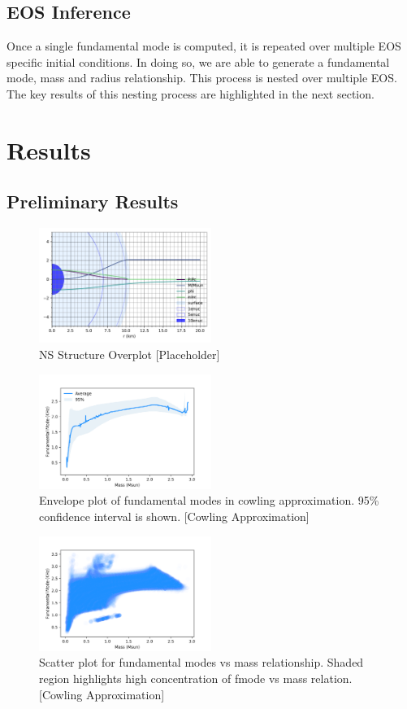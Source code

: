 \documentclass[aps,prd,twocolumn,superscriptaddress,footinbib]{revtex4-1}
\begin{document}
\subsection{EOS Inference}
Once a single fundamental mode is computed, it is repeated over multiple EOS specific initial conditions. In doing so, we are able to generate a fundamental mode, mass and radius relationship. This process is nested over multiple EOS. The key results of this nesting process are highlighted in the next section. 

\section{Results}
\subsection{Preliminary Results}
\begin{figure}[h]
\includegraphics[width=0.5\textwidth]{utkarsh_images/ns_params_overplot.pdf}
\caption{\label{fig:2} NS Structure Overplot [Placeholder]}
\end{figure}
\begin{figure}[h]
\includegraphics[width=0.5\textwidth]{utkarsh_images/fmode_envelope.png}
\caption{\label{fig:3} Envelope plot of fundamental modes in cowling approximation. 95\% confidence interval is shown. [Cowling Approximation]}
\end{figure}
\begin{figure}[h]
\includegraphics[width=0.5\textwidth]{utkarsh_images/fmode_scatter.png}
\caption{\label{fig:4} Scatter plot for fundamental modes vs mass relationship. Shaded region highlights high concentration of fmode vs mass relation. [Cowling Approximation]}
\end{figure}
\end{document}
